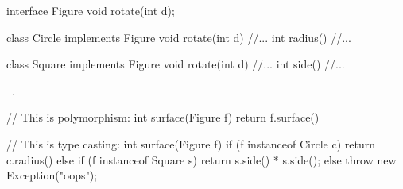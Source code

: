 \documentclass{article}
\begin{document}

\begin{pptWide}{2}
{\small\begin{ffcode}
interface Figure
  void rotate(int d);

class Circle implements Figure
  void rotate(int d) //...
  int radius() //...

class Square implements Figure
  void rotate(int d) //...
  int side() //...
\end{ffcode}
}
\par
{}~\citep{bugayenko2020blog1110}.
\par\columnbreak\par
{\small\begin{ffcode}
// This is polymorphism:
int surface(Figure f)
  return f.surface()

// This is type casting:
int surface(Figure f)
  if (f instanceof Circle c) {
    return c.radius()
  } else if (f instanceof Square s) {
    return s.side() * s.side();
  } else {
    throw new Exception("oops");
  }
\end{ffcode}
}
\end{pptWide}
\par
\plush{}
\end{document}
